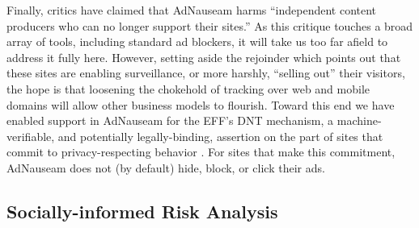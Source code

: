 \documentclass[conference]{IEEEtran}
\begin{document}


\indent Finally, critics have claimed that AdNauseam harms “independent content producers who can no longer support their sites.” As this critique touches a broad array of tools, including standard ad blockers, it will take us too far afield to address it fully here. However, setting aside the rejoinder which points out that these sites are enabling surveillance, or more harshly, “selling out” their visitors, the hope is that loosening the chokehold of tracking over web and mobile domains will allow other business models to flourish. Toward this end we have enabled support in AdNauseam for the EFF's DNT mechanism, a machine-verifiable, and potentially legally-binding, assertion on the part of sites that commit to privacy-respecting behavior \cite{EFF-1}. For sites that make this commitment, AdNauseam does not (by default) hide, block, or click their ads.

\subsection{Socially-informed Risk Analysis}
\end{document}
